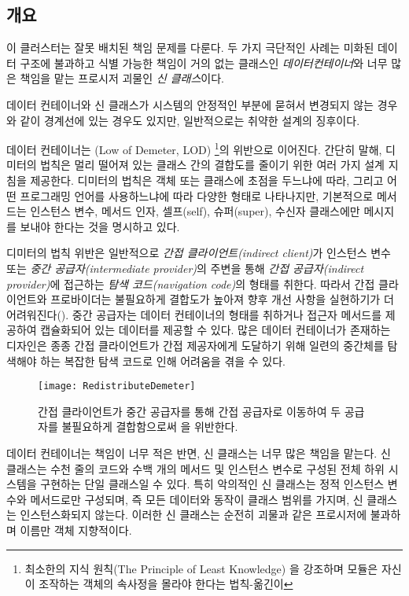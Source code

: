 \documentclass[a4paper,10pt,twoside]{book}
\begin{document}
\subsection*{개요}

이 클러스터는 잘못 배치된 책임 문제를 다룬다. 두 가지 극단적인 사례는 미화된 데이터 구조에 불과하고 식별 가능한 책임이 거의 없는 클래스인 \emph{데이터컨테이너}와 너무 많은 책임을 맡는 프로시저 괴물인 \emph{신 클래스}이다.

데이터 컨테이너와 신 클래스가 시스템의 안정적인 부분에 묻혀서 변경되지 않는 경우와 같이 경계선에 있는 경우도 있지만, 일반적으로는 취약한 설계의 징후이다.

데이터 컨테이너는 (Low of Demeter, LOD) \cite{Lieb88a}\footnote{최소한의 지식 원칙(The Principle of Least Knowledge) 을 강조하며 모듈은 자신이 조작하는 객체의 속사정을 몰라야 한다는 법칙-옮긴이}의 위반으로 이어진다. 간단히 말해, 디미터의 법칙은 멀리 떨어져 있는 클래스 간의 결합도를 줄이기 위한 여러 가지 설계 지침을 제공한다. 디미터의 법칙은 객체 또는 클래스에 초점을 두느냐에 따라, 그리고 어떤 프로그래밍 언어를 사용하느냐에 따라 다양한 형태로 나타나지만, 기본적으로 메서드는 인스턴스 변수, 메서드 인자, 셀프(self), 슈퍼(super), 수신자 클래스에만 메시지를 보내야 한다는 것을 명시하고 있다.

디미터의 법칙 위반은 일반적으로 \emph{간접 클라이언트(indirect client)}가 인스턴스 변수 또는 \emph{중간 공급자(intermediate provider)}의 주변을 통해 \emph{간접 공급자(indirect provider)}에 접근하는 \emph{탐색 코드(navigation code)}의 형태를 취한다. 따라서 간접 클라이언트와 프로바이더는 불필요하게 결합도가 높아져 향후 개선 사항을 실현하기가 더 어려워진다(). 중간 공급자는 데이터 컨테이너의 형태를 취하거나 접근자 메서드를 제공하여 캡슐화되어 있는 데이터를 제공할 수 있다. 많은 데이터 컨테이너가 존재하는 디자인은 종종 간접 클라이언트가 간접 제공자에게 도달하기 위해 일련의 중간체를 탐색해야 하는 복잡한 탐색 코드로 인해 어려움을 겪을 수 있다.

\begin{figure}[h]
\begin{center}
\texttt{[image: RedistributeDemeter]}
\caption{간접 클라이언트가 중간 공급자를 통해 간접 공급자로 이동하여 두 공급자를 불필요하게 결합함으로써 을 위반한다.}
\end{center}
\end{figure}

데이터 컨테이너는 책임이 너무 적은 반면, 신 클래스는 너무 많은 책임을 맡는다. 신 클래스는 수천 줄의 코드와 수백 개의 메서드 및 인스턴스 변수로 구성된 전체 하위 시스템을 구현하는 단일 클래스일 수 있다. 특히 악의적인 신 클래스는 정적 인스턴스 변수와 메서드로만 구성되며, 즉 모든 데이터와 동작이 클래스 범위를 가지며, 신 클래스는 인스턴스화되지 않는다. 이러한 신 클래스는 순전히 괴물과 같은 프로시저에 불과하며 이름만 객체 지향적이다. 
\end{document}
